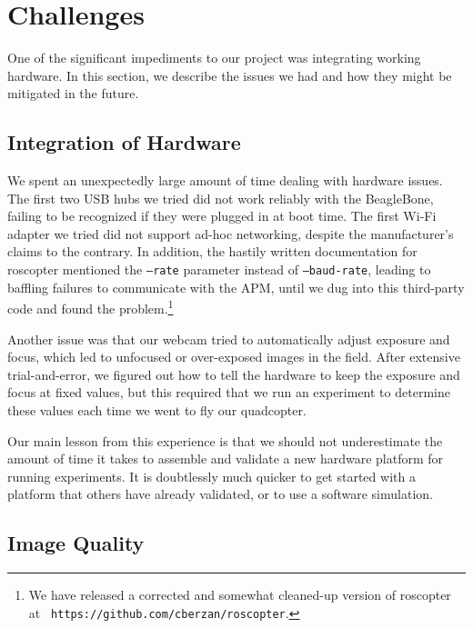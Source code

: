 \documentclass[10pt]{scrartcl} %
\begin{document}

\section{Challenges}
One of the significant impediments to our project was integrating working hardware. In this section, we describe the issues we had and how they might be mitigated in the future.

\subsection{Integration of Hardware}

We spent an unexpectedly large amount of time dealing with hardware issues. The
first two USB hubs we tried did not work reliably with the BeagleBone, failing
to be recognized if they were plugged in at boot time. The first Wi-Fi adapter
we tried did not support ad-hoc networking, despite the manufacturer's claims
to the contrary. In addition, the hastily written documentation for roscopter
mentioned the {\tt --rate} parameter instead of {\tt --baud-rate}, leading to
baffling failures to communicate with the APM, until we dug into this
third-party code and found the problem.\footnote{We have released a corrected
and somewhat cleaned-up version of roscopter at {\tt
https://github.com/cberzan/roscopter}.}

Another issue was that our webcam tried to automatically adjust exposure and
focus, which led to unfocused or over-exposed images in the field. After
extensive trial-and-error, we figured out how to tell the hardware to keep the
exposure and focus at fixed values, but this required that we run an experiment
to determine these values each time we went to fly our quadcopter.

Our main lesson from this experience is that we should not underestimate the
amount of time it takes to assemble and validate a new hardware platform for
running experiments. It is doubtlessly much quicker to get started with a
platform that others have already validated, or to use a software simulation.

\subsection{Image Quality}
\end{document}
